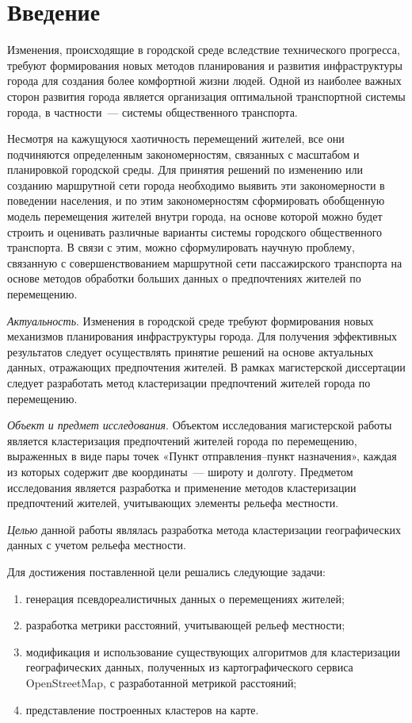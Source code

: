 \part{Введение}

Изменения, происходящие в городской среде вследствие технического прогресса, требуют формирования новых методов планирования и развития инфраструктуры города для создания более комфортной жизни людей. Одной из наиболее важных сторон развития города является организация оптимальной транспортной системы города, в частности~--- системы общественного транспорта.

Несмотря на кажущуюся хаотичность перемещений жителей, все они подчиняются определенным закономерностям, связанных с масштабом и планировкой городской среды. Для принятия решений по изменению или созданию маршрутной сети города необходимо выявить эти закономерности в поведении населения, и по этим закономерностям сформировать обобщенную модель перемещения жителей внутри города, на основе которой можно будет строить и оценивать различные варианты системы городского общественного транспорта. В связи с этим, можно сформулировать научную проблему, связанную с совершенствованием маршрутной сети пассажирского транспорта на основе методов обработки больших данных о предпочтениях жителей по перемещению.

\emph{Актуальность}. Изменения в городской среде требуют формирования новых механизмов планирования инфраструктуры города. Для получения эффективных результатов следует осуществлять принятие решений на основе актуальных данных, отражающих предпочтения жителей. В рамках магистерской диссертации следует разработать метод кластеризации предпочтений жителей города по перемещению.

\emph{Объект и предмет исследования}. Объектом исследования магистерской работы является кластеризация предпочтений жителей города по перемещению, выраженных в виде пары точек «Пункт отправления--пункт назначения», каждая из которых содержит две координаты~--- широту и долготу. Предметом исследования является разработка и применение методов кластеризации предпочтений жителей, учитывающих элементы рельефа местности.

\emph{Целью} данной работы являлась разработка метода кластеризации географических данных с учетом рельефа местности.

Для достижения поставленной цели решались следующие задачи:
\begin{enumerate}
    \item генерация псевдореалистичных данных о перемещениях жителей;
    \item разработка метрики расстояний, учитывающей рельеф местности;
    \item модификация и использование существующих алгоритмов для кластеризации географических данных, полученных из картографического сервиса OpenStreetMap, с разработанной метрикой расстояний;
    \item представление построенных кластеров на карте.
\end{enumerate}

